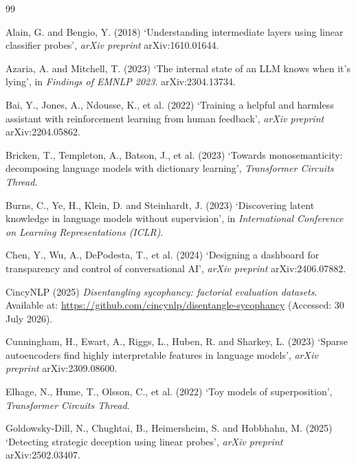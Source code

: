 \documentclass[conference]{IEEEtran}
\begin{document}
\begin{thebibliography}{99}
\setlength{\itemsep}{2pt}

Alain, G. and Bengio, Y. (2018) `Understanding intermediate layers using linear
classifier probes', \textit{arXiv preprint} arXiv:1610.01644.

Azaria, A. and Mitchell, T. (2023) `The internal state of an LLM knows when it's
lying', in \textit{Findings of EMNLP 2023}. arXiv:2304.13734.

Bai, Y., Jones, A., Ndousse, K., et al. (2022) `Training a helpful and harmless
assistant with reinforcement learning from human feedback', \textit{arXiv
preprint} arXiv:2204.05862.

Bricken, T., Templeton, A., Batson, J., et al. (2023) `Towards monosemanticity:
decomposing language models with dictionary learning',
\textit{Transformer Circuits Thread}.

Burns, C., Ye, H., Klein, D. and Steinhardt, J. (2023) `Discovering latent
knowledge in language models without supervision', in \textit{International
Conference on Learning Representations (ICLR)}.

Chen, Y., Wu, A., DePodesta, T., et al. (2024) `Designing a dashboard for
transparency and control of conversational AI', \textit{arXiv preprint}
arXiv:2406.07882.

CincyNLP (2025) \textit{Disentangling sycophancy: factorial evaluation
datasets}. Available at: \url{https://github.com/cincynlp/disentangle-sycophancy}
(Accessed: 30 July 2026).

Cunningham, H., Ewart, A., Riggs, L., Huben, R. and Sharkey, L. (2023) `Sparse
autoencoders find highly interpretable features in language models',
\textit{arXiv preprint} arXiv:2309.08600.

Elhage, N., Hume, T., Olsson, C., et al. (2022) `Toy models of superposition',
\textit{Transformer Circuits Thread}.

Goldowsky-Dill, N., Chughtai, B., Heimersheim, S. and Hobbhahn, M. (2025)
`Detecting strategic deception using linear probes', \textit{arXiv preprint}
arXiv:2502.03407.


\end{thebibliography}
\end{document}
